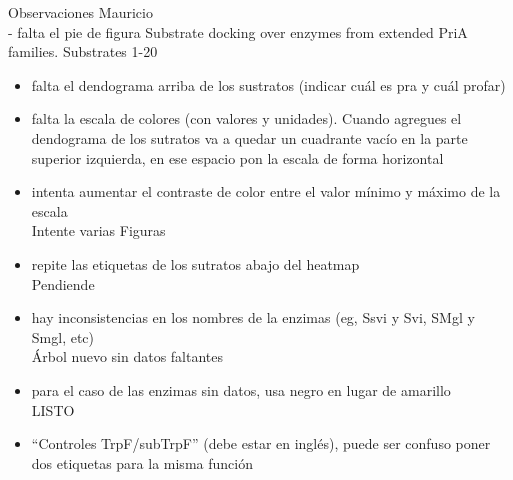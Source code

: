 \documentclass[12pt,twoside]{reedthesis}
\begin{document}
  Observaciones Mauricio\\
  - falta el pie de figura Substrate docking over enzymes from extended
  PriA families. Substrates 1-20
  
  \begin{itemize}
  \item
    falta el dendograma arriba de los sustratos (indicar cuál es pra y
    cuál profar)
  \item
    falta la escala de colores (con valores y unidades). Cuando agregues
    el dendograma de los sutratos va a quedar un cuadrante vacío en la
    parte superior izquierda, en ese espacio pon la escala de forma
    horizontal
  \item
    intenta aumentar el contraste de color entre el valor mínimo y máximo
    de la escala\\
    Intente varias Figuras
  \item
    repite las etiquetas de los sutratos abajo del heatmap\\
    Pendiende
  \item
    hay inconsistencias en los nombres de la enzimas (eg, Ssvi y Svi, SMgl
    y Smgl, etc)\\
    Árbol nuevo sin datos faltantes
  \item
    para el caso de las enzimas sin datos, usa negro en lugar de
    amarillo\\
    LISTO
  \item
    ``Controles TrpF/subTrpF'' (debe estar en inglés), puede ser confuso
    poner dos etiquetas para la misma función
  \end{itemize}
  
\end{document}
